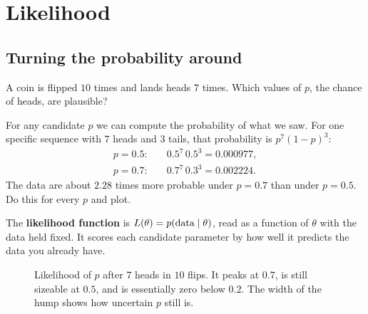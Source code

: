 \section{Likelihood}
\label{sec:lik-likelihood}

\subsection{Turning the probability around}

A coin is flipped $10$ times and lands heads $7$ times. Which values of $p$, the chance
of heads, are plausible?

For any candidate $p$ we can compute the probability of what we saw. For one specific
sequence with $7$ heads and $3$ tails, that probability is $p^7(1-p)^3$:
\begin{align*}
  p=0.5:&\quad 0.5^7\,0.5^3 = 0.000977,\\
  p=0.7:&\quad 0.7^7\,0.3^3 = 0.002224 .
\end{align*}
The data are about $2.28$ times more probable under $p=0.7$ than under $p=0.5$. Do this
for every $p$ and plot.

\begin{definition}
The \textbf{likelihood function} is $L(\theta) = p(\text{data}\mid\theta)$, read as a
function of $\theta$ with the data held fixed. It scores each candidate parameter by
how well it predicts the data you already have.
\end{definition}

\begin{figure}[H]
\centering
{}
\caption{Likelihood of $p$ after $7$ heads in $10$ flips. It peaks at $0.7$, is
still sizeable at $0.5$, and is essentially zero below $0.2$. The width of the hump
shows how uncertain $p$ still is.}
\label{fig:lik-coin-likelihood}
\end{figure}

